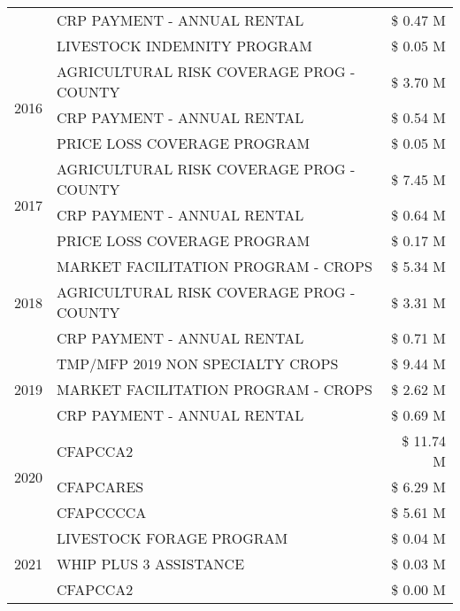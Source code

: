 \begin{tabular}{llr}
 & CRP PAYMENT - ANNUAL RENTAL & \$ 0.47 M \\
 & LIVESTOCK INDEMNITY PROGRAM & \$ 0.05 M \\
\cline{1-3}
\multirow[t]{3}{*}{2016} & AGRICULTURAL RISK COVERAGE PROG - COUNTY & \$ 3.70 M \\
 & CRP PAYMENT - ANNUAL RENTAL & \$ 0.54 M \\
 & PRICE LOSS COVERAGE PROGRAM & \$ 0.05 M \\
\cline{1-3}
\multirow[t]{3}{*}{2017} & AGRICULTURAL RISK COVERAGE PROG - COUNTY & \$ 7.45 M \\
 & CRP PAYMENT - ANNUAL RENTAL & \$ 0.64 M \\
 & PRICE LOSS COVERAGE PROGRAM & \$ 0.17 M \\
\cline{1-3}
\multirow[t]{3}{*}{2018} & MARKET FACILITATION PROGRAM - CROPS & \$ 5.34 M \\
 & AGRICULTURAL RISK COVERAGE PROG - COUNTY & \$ 3.31 M \\
 & CRP PAYMENT - ANNUAL RENTAL & \$ 0.71 M \\
\cline{1-3}
\multirow[t]{3}{*}{2019} & TMP/MFP 2019 NON SPECIALTY CROPS & \$ 9.44 M \\
 & MARKET FACILITATION PROGRAM - CROPS & \$ 2.62 M \\
 & CRP PAYMENT - ANNUAL RENTAL & \$ 0.69 M \\
\cline{1-3}
\multirow[t]{3}{*}{2020} & CFAPCCA2 & \$ 11.74 M \\
 & CFAPCARES & \$ 6.29 M \\
 & CFAPCCCCA & \$ 5.61 M \\
\cline{1-3}
\multirow[t]{3}{*}{2021} & LIVESTOCK FORAGE PROGRAM & \$ 0.04 M \\
 & WHIP PLUS 3 ASSISTANCE & \$ 0.03 M \\
 & CFAPCCA2 & \$ 0.00 M \\
\cline{1-3}
\bottomrule
\end{tabular}
